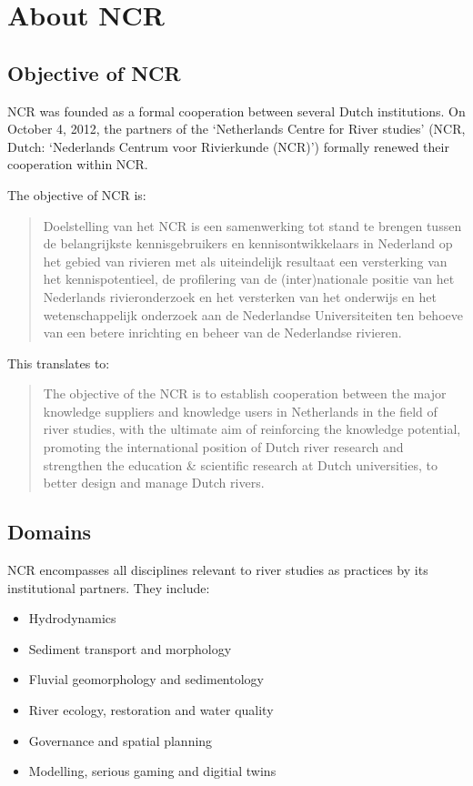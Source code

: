 \chapter{About NCR}
\begin{multicols}{2}

\section{Objective of NCR}
NCR was founded as a formal cooperation between several Dutch institutions. On October 4, 2012, the partners of the `Netherlands Centre for River studies' (NCR, Dutch: `Nederlands Centrum voor Rivierkunde (NCR)') formally renewed their cooperation within NCR.

The objective of NCR is:

\begin{quote}
Doelstelling van het NCR is een samenwerking tot stand te brengen tussen de belangrijkste kennisgebruikers en kennisontwikkelaars in Nederland op het gebied van rivieren met als uiteindelijk resultaat een versterking van het kennispotentieel, de profilering van de (inter)nationale positie van het Nederlands rivieronderzoek en het versterken van het onderwijs en het wetenschappelijk onderzoek aan de Nederlandse Universiteiten ten behoeve van een betere inrichting en beheer van de Nederlandse rivieren.
\end{quote}

This translates to:

\begin{quote}
The objective of the NCR is to establish cooperation between the major knowledge suppliers and knowledge users in Netherlands in the field of river studies, with the ultimate aim of reinforcing the knowledge potential, promoting the international position of Dutch river research and strengthen the education \& scientific research at Dutch universities, to better design and manage Dutch rivers.
\end{quote}

\section{Domains}
\label{section:domains}
NCR encompasses all disciplines relevant to river studies as practices by its institutional partners. They include:
\begin{itemize}
    \item Hydrodynamics
    \item Sediment transport and morphology
    \item Fluvial geomorphology and sedimentology
    \item River ecology, restoration and water quality
    \item Governance and spatial planning
    \item Modelling, serious gaming and digitial twins
\end{itemize}



\end{multicols}
